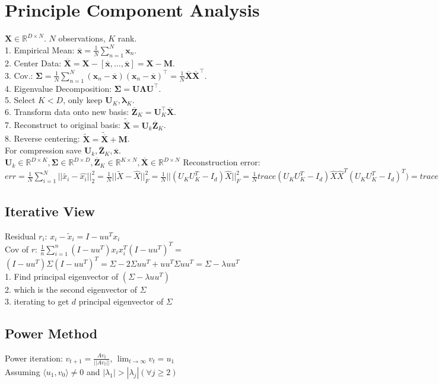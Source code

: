 \section{Principle Component Analysis}
$\mathbf{X} \in \mathbb{R}^{D \times N}$. $N$ observations, $K$ rank.\\
1. Empirical Mean: $\overline{\mathbf{x}} = \frac{1}{N} \sum_{n=1}^N \mathbf{x}_n$.\\
2. Center Data: $\overline{\mathbf{X}} = \mathbf{X} - [\overline{\mathbf{x}}, \ldots, \overline{\mathbf{x}}] = \mathbf{X} - \mathbf{M}$.\\
3. Cov.: $\boldsymbol{\Sigma} = \frac{1}{N	} \sum_{n=1}^N (\mathbf{x}_n - \overline{\mathbf{x}}) (\mathbf{x}_n - \overline{\mathbf{x}})^\top = \frac{1}{N} \overline{\mathbf{X}}\overline{\mathbf{X}}^\top$.\\
4. Eigenvalue Decomposition: $\boldsymbol{\Sigma} = \mathbf{U} \boldsymbol{\Lambda} \mathbf{U}^\top$.\\
5. Select $K < D$, only keep $\mathbf{U}_K, \boldsymbol{\lambda}_K$.\\
6. Transform data onto new basis: $\overline{\mathbf{Z}}_K = \mathbf{U}_K^\top \overline{\mathbf{X}}$.\\
7. Reconstruct to original basis: $\tilde{\overline{\mathbf{X}}} = \mathbf{U}_k \overline{\mathbf{Z}}_K$.\\
8. Reverse centering: $\tilde{\mathbf{X}} = \tilde{\overline{\mathbf{X}}} + \mathbf{M}$.\\
For compression save $\mathbf{U}_k, \overline{\mathbf{Z}}_K, \overline{\mathbf{x}}$.\\
$\mathbf{U}_k \in \mathbb{R}^{D \times K}, \boldsymbol{\Sigma} \in \mathbb{R}^{D \times D}, \overline{\mathbf{Z}}_K \in \mathbb{R}^{K \times N}, \overline{\mathbf{X}} \in \mathbb{R}^{D \times N}$
Reconstruction error: $err = \frac{1}{N}\sum_{i=1}^N ||\tilde{x_i}-\hat{x_i}||_2^2 = \frac{1}{N}||\tilde{X}-\hat{X}||_F^2 = \frac{1}{N}||(U_KU_K^T-I_d)\hat{X}||_F^2= \frac{1}{N}trace(U_KU_K^T-I_d)\hat{X}\hat{X}^T(U_KU_K^T-I_d)^T) = trace(U_KU_K^T-I_d)U\Lambda U^T(U_KU_K^T-I_d)) = trace([U_k;0]-U)\Lambda([U_K;0]-U)^T) = trace(\sum_{i=K+1}^D\lambda_iu_iu_i^T)= \sum_{i=K+1}^D\lambda_i$

\subsection*{Iterative View}
Residual $r_i$: $x_i - \tilde{x}_i = I - uu^T  x_i$\\
Cov of $r$:  $\frac{1}{n} \sum_{i=1}^n (I-uu^T)x_i x_i^T (I-uu^T)^T =$ \\
$(I-uu^T) \Sigma (I-uu^T)^T = \Sigma - 2\Sigma u u^T + u u^T \Sigma u u ^T = \Sigma - \lambda uu^T$ \\
1. Find principal eigenvector of $(\Sigma - \lambda u u^T)$\\
2. which is the second eigenvector of $\Sigma$\\
3. iterating to get $d$ principal eigenvector of $\Sigma$

\subsection*{Power Method}
Power iteration: $v_{t+1} = \frac{Av_t}{||Av_t||}$, $\lim_{t \rightarrow \infty} v_t = u_1$\\
Assuming $\langle u_1, v_0 \rangle \not = 0$ and $|\lambda_1| > |\lambda_j| (\forall j \geq 2)$
